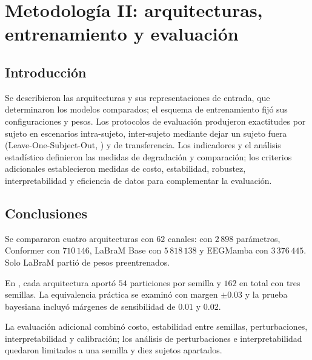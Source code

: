 \chapter{Metodología II: arquitecturas, entrenamiento y evaluación}
\label{cap:metodologia-modelos}
\section{Introducción}
Se describieron las arquitecturas y sus representaciones de entrada, que determinaron los modelos comparados; el esquema de entrenamiento fijó sus configuraciones y pesos. Los protocolos de evaluación produjeron exactitudes por sujeto en escenarios intra-sujeto, inter-sujeto mediante dejar un sujeto fuera (Leave-One-Subject-Out, \loso{}) y de transferencia. Los indicadores y el análisis estadístico definieron las medidas de degradación y comparación; los criterios adicionales establecieron medidas de costo, estabilidad, robustez, interpretabilidad y eficiencia de datos para complementar la evaluación.


\section{Conclusiones}
Se compararon cuatro arquitecturas con $62$ canales: \eegnet{} con $2\,898$ parámetros, Conformer con $710\,146$, LaBraM Base con $5\,818\,138$ y EEGMamba con $3\,376\,445$. Solo LaBraM partió de pesos preentrenados.

En \loso{}, cada arquitectura aportó $54$ particiones por semilla y $162$ en total con tres semillas. La equivalencia práctica se examinó con margen $\pm 0.03$ y la prueba bayesiana incluyó márgenes de sensibilidad de $0.01$ y $0.02$.

La evaluación adicional combinó costo, estabilidad entre semillas, perturbaciones, interpretabilidad y calibración; los análisis de perturbaciones e interpretabilidad quedaron limitados a una semilla y diez sujetos apartados.
